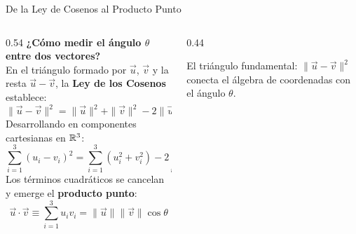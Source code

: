 \documentclass[10pt,aspectratio=169]{beamer}
\begin{document}
\begin{frame}{De la Ley de Cosenos al Producto Punto}
  \begin{columns}[c]
    \begin{column}{0.54\textwidth}
      \footnotesize
      \textbf{¿Cómo medir el ángulo $\theta$ entre dos vectores?}\\[4pt]
      En el triángulo formado por $\vec{u}$, $\vec{v}$ y la resta $\vec{u}-\vec{v}$, la \textbf{Ley de los Cosenos} establece:
      \[
      \|\vec{u} - \vec{v}\|^2 = \|\vec{u}\|^2 + \|\vec{v}\|^2 - 2\|\vec{u}\|\|\vec{v}\|\cos\theta
      \]
      Desarrollando en componentes cartesianas en $\mathbb{R}^3$:
      \[
      \sum_{i=1}^3 (u_i - v_i)^2 = \sum_{i=1}^3 (u_i^2 + v_i^2) - 2\sum_{i=1}^3 u_i v_i
      \]
      Los términos cuadráticos se cancelan y emerge el \textbf{producto punto}:
      \[
      \boxed{\vec{u}\cdot\vec{v} \equiv \sum_{i=1}^3 u_i v_i = \|\vec{u}\|\|\vec{v}\|\cos\theta}
      \]
    \end{column}
    \begin{column}{0.44\textwidth}
      \centering
      \vspace{0.1cm}

      {\scriptsize El triángulo fundamental: $\|\vec{u}-\vec{v}\|^2$ conecta el álgebra de coordenadas con el ángulo $\theta$.}
    \end{column}
  \end{columns}
\end{frame}
\end{document}
